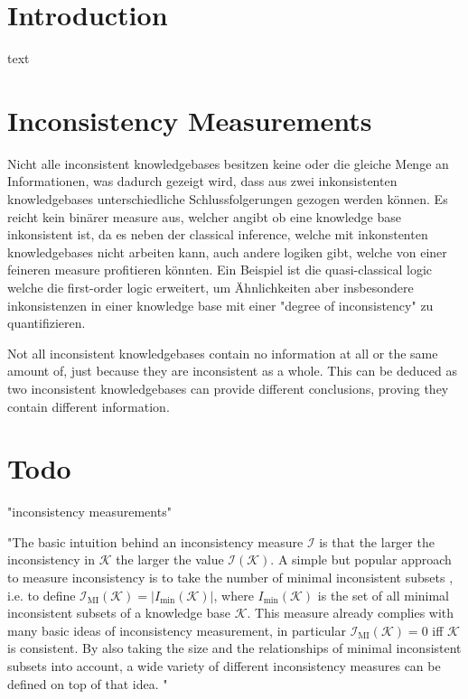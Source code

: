 \section{Introduction}
text

\section{Inconsistency Measurements}
Nicht alle inconsistent knowledgebases besitzen keine oder die gleiche Menge an Informationen, was dadurch gezeigt wird, dass aus zwei inkonsistenten knowledgebases unterschiedliche Schlussfolgerungen gezogen werden können. Es reicht kein binärer measure aus, welcher angibt ob eine knowledge base inkonsistent ist, da es neben der classical inference, welche mit inkonstenten knowledgebases nicht arbeiten kann, auch andere logiken gibt, welche von einer feineren measure profitieren könnten. \cite{bertossi_approaches_2005}
Ein Beispiel ist die quasi-classical logic welche die first-order logic erweitert, um Ähnlichkeiten aber insbesondere inkonsistenzen in einer knowledge base mit einer "degree of inconsistency" zu quantifizieren. \cite{grant_measuring_2006}

Not all inconsistent knowledgebases contain no information at all or the same amount of, just because they are inconsistent as a whole. This can be deduced as two inconsistent knowledgebases can provide different conclusions, proving they contain different information.


\section{Todo}

"inconsistency measurements"
\cite{bertossi_approaches_2005} \cite{grant_measuring_2006}

"The basic intuition behind an inconsistency measure \(\mathcal{I}\) is that the larger the inconsistency in \(\mathcal{K}\) the larger the value \(\mathcal{I}(\mathcal{K})\). A simple but popular approach to measure inconsistency is to take the number of minimal inconsistent subsets \cite{hunter_measuring_2008}, i.e. to define \(\mathcal{I}_{\text{MI}}(\mathcal{K}) = \left| I_{\min}(\mathcal{K}) \right|\), where \(I_{\min}(\mathcal{K})\) is the set of all minimal inconsistent subsets of a knowledge base \(\mathcal{K}\). This measure already complies with many basic ideas of inconsistency measurement, in particular \(\mathcal{I}_{\text{MI}}(\mathcal{K})=0\) iff \(\mathcal{K}\) is consistent. By also taking the size and the relationships of minimal inconsistent subsets into account, a wide variety of different inconsistency measures can be defined on top of that idea. \cite{hunter_measuring_2008} \cite{jabbour_mis_2016}"

